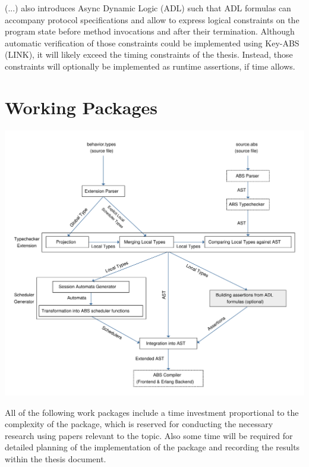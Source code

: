 \documentclass[paper=a4,nochapname,accentcolor=tud9c]{tudexercise}
\begin{document}

(...) also introduces Async Dynamic Logic (ADL) such that ADL formulas can
accompany protocol specifications and allow to express logical constraints on the
program state before method invocations and after their termination.
Although automatic verification of those constraints could  be implemented using
Key-ABS (LINK), it will likely exceed the timing constraints of the thesis.
Instead, those constraints will optionally be implemented as runtime assertions,
if time allows.

\section{Working Packages}
%
\includegraphics[width=\linewidth]{assets/architecture.pdf}

All of the following work packages include a time investment proportional to the
complexity of the package, which is reserved for conducting the necessary
research using papers relevant to the topic. Also some time will be required for
detailed planning of the implementation of the package and recording the results
within the thesis document.
\end{document}
